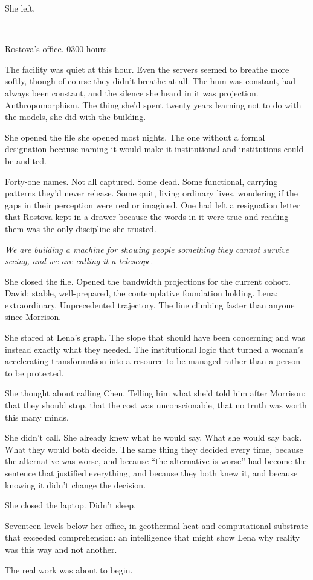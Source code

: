 She left.

---

Rostova's office. 0300 hours.

The facility was quiet at this hour. Even the servers seemed to breathe more softly, though of course they didn't breathe at all. The hum was constant, had always been constant, and the silence she heard in it was projection. Anthropomorphism. The thing she'd spent twenty years learning not to do with the models, she did with the building.

She opened the file she opened most nights. The one without a formal designation because naming it would make it institutional and institutions could be audited.

Forty-one names. Not all captured. Some dead. Some functional, carrying patterns they'd never release. Some quit, living ordinary lives, wondering if the gaps in their perception were real or imagined. One had left a resignation letter that Rostova kept in a drawer because the words in it were true and reading them was the only discipline she trusted.

\textit{We are building a machine for showing people something they cannot survive seeing, and we are calling it a telescope.}

She closed the file. Opened the bandwidth projections for the current cohort. David: stable, well-prepared, the contemplative foundation holding. Lena: extraordinary. Unprecedented trajectory. The line climbing faster than anyone since Morrison.

She stared at Lena's graph. The slope that should have been concerning and was instead exactly what they needed. The institutional logic that turned a woman's accelerating transformation into a resource to be managed rather than a person to be protected.

She thought about calling Chen. Telling him what she'd told him after Morrison: that they should stop, that the cost was unconscionable, that no truth was worth this many minds.

She didn't call. She already knew what he would say. What she would say back. What they would both decide. The same thing they decided every time, because the alternative was worse, and because ``the alternative is worse'' had become the sentence that justified everything, and because they both knew it, and because knowing it didn't change the decision.

She closed the laptop. Didn't sleep.

Seventeen levels below her office, in geothermal heat and computational substrate that exceeded comprehension: an intelligence that might show Lena why reality was this way and not another.

The real work was about to begin.
